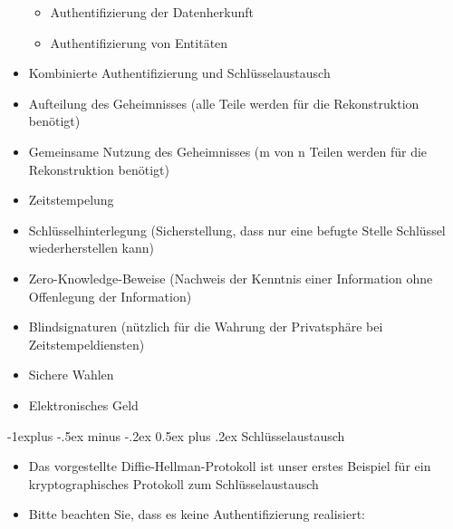 \documentclass[a4paper]{article}
\makeatletter
\renewcommand{\subsection}{\@startsection{subsection}{2}{0mm}%
 {-1explus -.5ex minus -.2ex}%
 {0.5ex plus .2ex}%
 {\normalfont\normalsize\bfseries}}
\makeatother
\begin{document}
\begin{multicols}{3}
\begin{itemize}
              \begin{itemize}
                  \item
                        Authentifizierung der Datenherkunft
                  \item
                        Authentifizierung von Entitäten
              \end{itemize}
        \item
              Kombinierte Authentifizierung und Schlüsselaustausch
        \item
              Aufteilung des Geheimnisses (alle Teile werden für die Rekonstruktion
              benötigt)
        \item
              Gemeinsame Nutzung des Geheimnisses (m von n Teilen werden für die
              Rekonstruktion benötigt)
        \item
              Zeitstempelung
        \item
              Schlüsselhinterlegung (Sicherstellung, dass nur eine befugte Stelle
              Schlüssel wiederherstellen kann)
        \item
              Zero-Knowledge-Beweise (Nachweis der Kenntnis einer Information ohne
              Offenlegung der Information)
        \item
              Blindsignaturen (nützlich für die Wahrung der Privatsphäre bei
              Zeitstempeldiensten)
        \item
              Sichere Wahlen
        \item
              Elektronisches Geld
    \end{itemize}


    \subsection{Schlüsselaustausch}

    \begin{itemize}
        \item
              Das vorgestellte Diffie-Hellman-Protokoll ist unser erstes Beispiel
              für ein kryptographisches Protokoll zum Schlüsselaustausch
        \item
              Bitte beachten Sie, dass es keine Authentifizierung realisiert:


\end{itemize}
\end{multicols}
\end{document}
